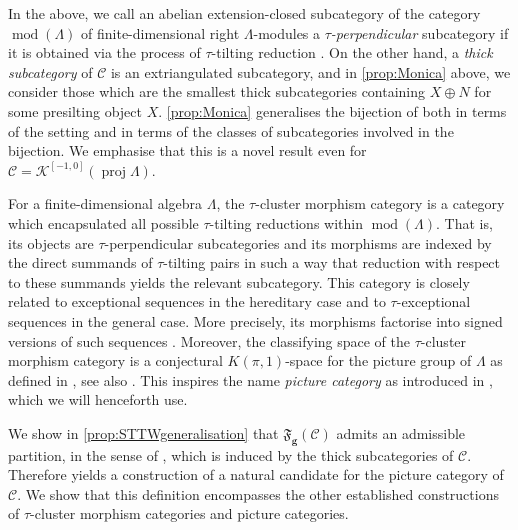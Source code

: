 \documentclass[10pt,twoside, a4paper,reqno]{amsart}
\DeclareMathOperator{\mods}{mod}
\DeclareMathOperator{\proj}{proj}
\newcommand{\Ktwo}{\mathcal{K}^{[-1,0]}}
\newcommand{\partfan}[1]{\mathfrak{F}_{\bfg}(#1)}
\newcommand{\calC}{\mathcal{C}}
\newcommand{\bfg}{\mathbf{g}}
\theoremstyle{definition}
\begin{document}
In the above, we call an abelian extension-closed subcategory of the category $\mods(\Lambda)$ of finite-dimensional right $\Lambda$-modules a \textit{$\tau$-perpendicular} subcategory if it is obtained via the process of $\tau$-tilting reduction \cite{Jas15,BH21}. On the other hand, a \textit{thick subcategory} of $\calC$ is an extriangulated subcategory, and in \cref{prop:Monica} above, we consider those which are the smallest thick subcategories containing $X \oplus N$ for some presilting object $X$. \cref{prop:Monica} generalises the bijection of \cite[Thm. 3.15]{Gar23} both in terms of the setting and in terms of the classes of subcategories involved in the bijection. We emphasise that this is a novel result even for $\calC = \Ktwo(\proj \Lambda)$.

For a finite-dimensional algebra $\Lambda$, the $\tau$-cluster morphism category \cite{IT17,BM18w,BH21,Bor21} is a category which encapsulated all possible $\tau$-tilting reductions within $\mods(\Lambda)$. That is, its objects are $\tau$-perpendicular subcategories and its morphisms are indexed by the {direct} summands of $\tau$-tilting pairs in such a way that reduction with respect to these summands yields the relevant subcategory. This category is closely related to exceptional sequences in the hereditary case \cite{IT17} and to $\tau$-exceptional sequences \cite{BM18t} in the general case. More precisely, its morphisms factorise into signed versions of such sequences {\cite[{§}11]{BM18t}}. Moreover, the classifying space of the $\tau$-cluster morphism category is a conjectural $K(\pi,1)$-space for the picture group of $\Lambda$ as defined in \cite{ITW16,HI21,Kai24}, see also \cite[Conjecture A.11]{BorveKaipeltautilt}. This inspires the name \textit{picture category} as introduced in \cite{Bor24}, which we will henceforth use. 

We show in \cref{prop:STTWgeneralisation} that $\partfan{\calC}$ admits an admissible partition, in the sense of \cite{Kai23}, which is induced by the thick subcategories of $\calC$. Therefore \cite[{§}3]{Kai23} yields a construction of a natural candidate for the picture category of $\calC$. We show that this definition encompasses the other established constructions of $\tau$-cluster morphism categories and picture categories. 
\end{document}
